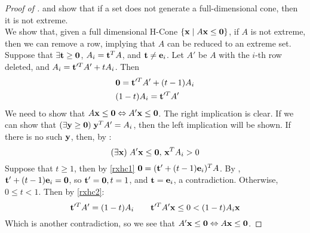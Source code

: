 \begin{proof}[Proof of ]
	 and  show that if a set does not generate a full-dimensional cone, then it is not extreme.\\
  We show that, given a full dimensional H-Cone $\left\{\mathbf{x}\;|\; A\mathbf{x}\leq\mathbf{0}\right\}$, if $A$ is not extreme, then we can remove a row, implying that $A$ can be reduced to an extreme set.  Suppose that $\exists\mathbf{t}\geq\mathbf{0}$, $A_i = \mathbf{t}^T A$, and $\mathbf{t}\neq\mathbf{e}_i$.  Let $A'$ be $A$ with the $i$-th row deleted, and $A_i = \mathbf{t}'^T A' + tA_i$.  Then
  \begin{align}
  &\mathbf{0} = \mathbf{t}'^T A' + (t-1)A_i \label{rxhc1}\\
  &(1-t)A_i = \mathbf{t}'^T A' \label{rxhc2}
  \end{align}
  We need to show that $A\mathbf{x}\leq\mathbf{0} \Leftrightarrow A'\mathbf{x}\leq\mathbf{0}$.  The right implication is clear.  If we can show that $(\exists\mathbf{y}\geq\mathbf{0})\;\mathbf{y}^T A'=A_i$, then the left implication will be shown.  If there is no such $\mathbf{y}$, then, by :
  \[(\exists\mathbf{x})\; A'\mathbf{x}\leq\mathbf{0},\, \mathbf{x}^T A_i > 0 \]
  Suppose that $t \geq 1$, then by \eqref{rxhc1} $\mathbf{0} = (\mathbf{t}'+(t-1)\mathbf{e}_i)^T A$.  By , $\mathbf{t}'+(t-1)\mathbf{e}_i = \mathbf{0}$, so $\mathbf{t}'=\mathbf{0}, t=1$, and $\mathbf{t} = \mathbf{e}_i$, a contradiction.  Otherwise, $0\leq t < 1$.  Then by \eqref{rxhc2}:
  \[\mathbf{t}'^T A' = (1-t)A_i \quad\quad \mathbf{t}'^T A'\mathbf{x} \leq 0 < (1-t)A_i\mathbf{x} \]
  Which is another contradiction, so we see that $A'\mathbf{x}\leq\mathbf{0} \Leftrightarrow A\mathbf{x}\leq\mathbf{0}$.
\end{proof}
